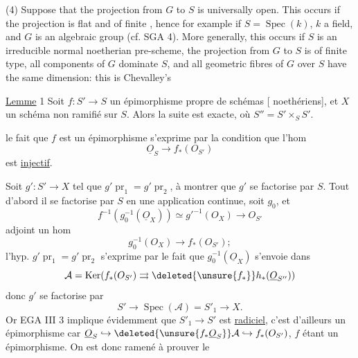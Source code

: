(4) Suppose that the projection from $G$ to $S$ is universally open. This occurs if the projection is flat and of  finite , hence for example if $S=\operatorname{Spec}(k)$, $k$ a field, and $G$ is an algebraic group (cf. SGA 4). More generally, this occurs if $S$ is an irreducible normal noetherian pre-scheme, the projection from $G$ to $S$ is  of finite type, all components of $G$ dominate $S$, and all geometric fibres of $G$ over $S$ have the same dimension: this is Chevalley's

\uline{Lemme} 1 Soit $f:S'\longrightarrow S$ un épimorphisme propre de schémas [ noethériens], et  $X$ un schéma  non ramifié sur $S$. Alors la suite
est exacte, où $S''=S'\times_S S'$.

 le fait que $f$ est un épimorphisme s'exprime par la condition que l'hom
\[
\underline O_S\longrightarrow f_*(O_{S'})
\]
est \uline{injectif}.

Soit $g':S'\longrightarrow X$ tel que $g'\operatorname{pr}_1=g'\operatorname{pr}_2$, à montrer que $g'$ se factorise par $S$. Tout d'abord il se factorise par $S$ en  une application continue, soit $g_0$, et
\[
f^{-1}(g_0^{-1}(\underline O_X))\simeq g'^{-1}(O_X)\longrightarrow O_{S'}
\]
adjoint un hom
\[
g_0^{-1}(O_X)\longrightarrow f_*(O_{S'});
\]
l'hyp. $g'\operatorname{pr}_1=g'\operatorname{pr}_2$ s'exprime par le fait que $g_0^{-1}(\underline O_X)$ s'envoie dans
\[
\mathcal A=\operatorname{Ker}(f_*(O_{S'})\rightrightarrows\deleted{\unsure{f_*}}h_*(\underline O_{S''}))
\]
donc $g'$ se factorise par
\[
S'\longrightarrow\operatorname{Spec}(\mathcal A)=S'_1\longrightarrow X.
\]
Or EGA III 3 implique évidemment que $S'_1\longrightarrow S'$ est  \uline{radiciel}, c'est d'ailleurs un épimorphisme car $\underline O_S\hookrightarrow\deleted{\unsure{f_*\underline O_S}}\mathcal A\hookrightarrow f_*(O_{S'})$, $f$ étant un épimorphisme. On est donc ramené à prouver le

